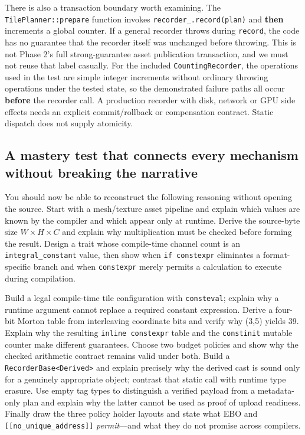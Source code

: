 There is also a transaction boundary worth examining. The \texttt{TilePlanner::prepare} function invokes \texttt{recorder\_.record(plan)} and \textbf{then} increments a global counter. If a general recorder throws during \texttt{record}, the code has no guarantee that the recorder itself was unchanged before throwing. This is not Phase 2's full strong-guarantee asset publication transaction, and we must not reuse that label casually. For the included \texttt{CountingRecorder}, the operations used in the test are simple integer increments without ordinary throwing operations under the tested state, so the demonstrated failure paths all occur \textbf{before} the recorder call. A production recorder with disk, network or GPU side effects needs an explicit commit/rollback or compensation contract. Static dispatch does not supply atomicity.

\subsection{A mastery test that connects every mechanism without breaking the narrative}\label{05-engine-i-ch005-a-mastery-test-that-connects-every-mechanism-without-breaking-the-narrative}

You should now be able to reconstruct the following reasoning without opening the source. Start with a mesh/texture asset pipeline and explain which values are known by the compiler and which appear only at runtime. Derive the source-byte size \(W\times H\times C\) and explain why multiplication must be checked before forming the result. Design a trait whose compile-time channel count is an \texttt{integral\_constant} value, then show when \texttt{if\ constexpr} eliminates a format-specific branch and when \texttt{constexpr} merely permits a calculation to execute during compilation.

Build a legal compile-time tile configuration with \texttt{consteval}; explain why a runtime argument cannot replace a required constant expression. Derive a four-bit Morton table from interleaving coordinate bits and verify why (3,5) yields 39. Explain why the resulting \texttt{inline\ constexpr} table and the \texttt{constinit} mutable counter make different guarantees. Choose two budget policies and show why the checked arithmetic contract remains valid under both. Build a \texttt{RecorderBase\textless{}Derived\textgreater{}} and explain precisely why the derived cast is sound only for a genuinely appropriate object; contrast that static call with runtime type erasure. Use empty tag types to distinguish a verified payload from a metadata-only plan and explain why the latter cannot be used as proof of upload readiness. Finally draw the three policy holder layouts and state what EBO and \texttt{{[}{[}no\_unique\_address{]}{]}} \emph{permit}---and what they do not promise across compilers.

